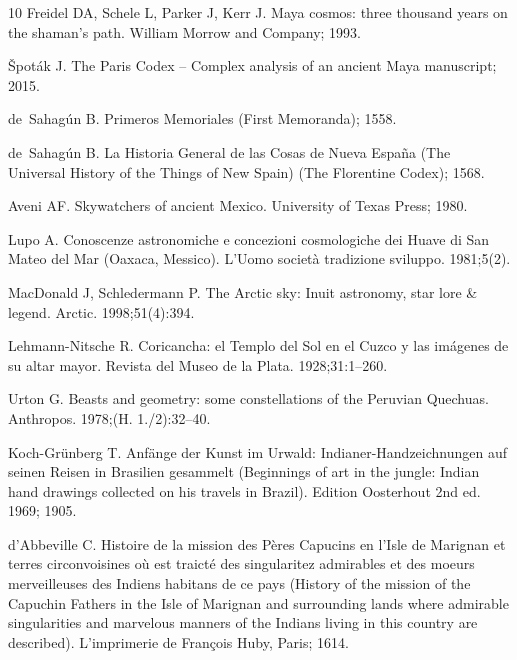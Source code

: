 \documentclass[10pt]{article}
\begin{document}
{\begin{thebibliography}{10}
Freidel DA, Schele L, Parker J, Kerr J.
\newblock Maya cosmos: three thousand years on the shaman's path.
\newblock William Morrow and Company; 1993.

\v{S}pot{\'a}k J.
\newblock The {Paris Codex} -- {C}omplex analysis of an ancient {M}aya
  manuscript; 2015.

de~Sahag{\'u}n B.
\newblock Primeros {M}emoriales ({F}irst Memoranda); 1558.

de~Sahag{\'u}n B.
\newblock La Historia General de las Cosas de {N}ueva {E}spa{\~n}a ({T}he
  Universal History of the Things of {N}ew {S}pain) ({The Florentine Codex});
  1568.

Aveni AF.
\newblock Skywatchers of ancient {M}exico.
\newblock University of Texas Press; 1980.

Lupo A.
\newblock Conoscenze astronomiche e concezioni cosmologiche dei {Huave di San
  Mateo del Mar (Oaxaca, Messico)}.
\newblock L'Uomo societ{\`a} tradizione sviluppo. 1981;5(2).

MacDonald J, Schledermann P.
\newblock The {A}rctic sky: Inuit astronomy, star lore \& legend.
\newblock Arctic. 1998;51(4):394.

Lehmann-Nitsche R.
\newblock Coricancha: el Templo del Sol en el Cuzco y las im{\'a}genes de su
  altar mayor.
\newblock Revista del Museo de la Plata. 1928;31:1--260.

Urton G.
\newblock Beasts and geometry: some constellations of the {Peruvian Quechuas}.
\newblock Anthropos. 1978;(H. 1./2):32--40.

Koch-Gr{\"u}nberg T.
\newblock Anf{\"a}nge der Kunst im Urwald: Indianer-Handzeichnungen auf seinen
  Reisen in Brasilien gesammelt ({B}eginnings of art in the jungle: {I}ndian
  hand drawings collected on his travels in {B}razil).
\newblock Edition Oosterhout 2nd ed. 1969; 1905.

d'Abbeville C.
\newblock Histoire de la mission des P{\`e}res {C}apucins en l'{I}sle de
  {M}arignan et terres circonvoisines o{\`u} est traict{\'e} des singularitez
  admirables et des moeurs merveilleuses des {I}ndiens habitans de ce pays
  ({H}istory of the mission of the {C}apuchin Fathers in the {I}sle of
  {M}arignan and surrounding lands where admirable singularities and marvelous
  manners of the {I}ndians living in this country are described).
\newblock L'imprimerie de Fran{\c{c}}ois Huby, Paris; 1614.


\end{thebibliography}}
\end{document}
